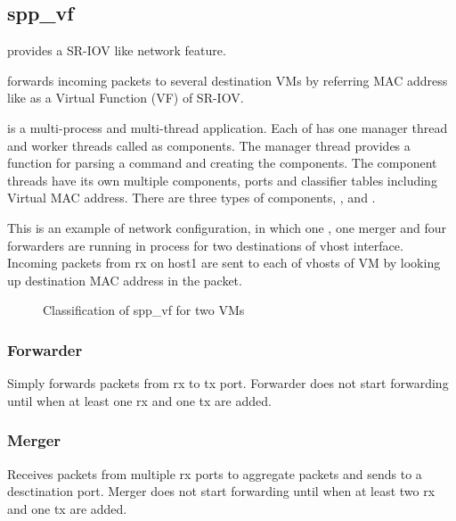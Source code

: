\documentclass[a4paper,11pt,openany,oneside,english]{sphinxmanual}
\begin{document}
\subsection{spp\_vf}
\label{\detokenize{design/spp_secondary:spp-vf}}\label{\detokenize{design/spp_secondary:spp-design-spp-sec-vf}}
 provides a SR-IOV like network feature.

 forwards incoming packets to several destination VMs by referring
MAC address like as a Virtual Function (VF) of SR-IOV.

 is a  multi-process and multi-thread application.
Each of  has one manager thread and worker threads called as
components.
The manager thread provides a function for parsing a command and creating the
components.
The component threads have its own multiple components, ports and classifier
tables including Virtual MAC address.
There are three types of components, ,
 and .

This is an example of network configuration, in which one
,
one merger and four forwarders are running in  process
for two destinations of vhost interface.
Incoming packets from rx on host1 are sent to each of vhosts of VM
by looking up destination MAC address in the packet.

\begin{figure}[htbp]
\centering
\capstart

\noindent{}
\caption{Classification of spp\_vf for two VMs}\label{\detokenize{design/spp_secondary:id3}}\end{figure}


\subsubsection{Forwarder}
\label{\detokenize{design/spp_secondary:forwarder}}
Simply forwards packets from rx to tx port.
Forwarder does not start forwarding until when at least one rx and one tx are
added.


\subsubsection{Merger}
\label{\detokenize{design/spp_secondary:merger}}
Receives packets from multiple rx ports to aggregate
packets and sends to a desctination port.
Merger does not start forwarding until when at least two rx and one tx are
added.
\end{document}
